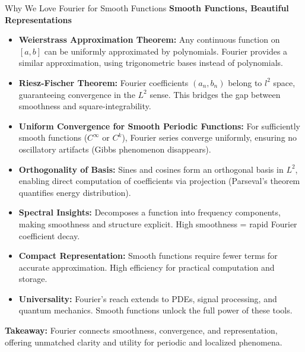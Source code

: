 \begin{frame}{Why We Love Fourier for Smooth Functions}
    \textbf{Smooth Functions, Beautiful Representations}
    \begin{itemize}
        \item \textbf{Weierstrass Approximation Theorem:} 
        Any continuous function on \([a, b]\) can be uniformly approximated by polynomials. Fourier provides a similar approximation, using trigonometric bases instead of polynomials.
        
        \item \textbf{Riesz-Fischer Theorem:} 
        Fourier coefficients \((a_n, b_n)\) belong to \(l^2\) space, guaranteeing convergence in the \(L^2\) sense. This bridges the gap between smoothness and square-integrability.

        \item \textbf{Uniform Convergence for Smooth Periodic Functions:} 
        For sufficiently smooth functions (\(C^\infty\) or \(C^k\)), Fourier series converge uniformly, ensuring no oscillatory artifacts (Gibbs phenomenon disappears).

        \item \textbf{Orthogonality of Basis:} 
        Sines and cosines form an orthogonal basis in \(L^2\), enabling direct computation of coefficients via projection (Parseval's theorem quantifies energy distribution).

        \item \textbf{Spectral Insights:} 
        Decomposes a function into frequency components, making smoothness and structure explicit. High smoothness = rapid Fourier coefficient decay.

        \item \textbf{Compact Representation:} 
        Smooth functions require fewer terms for accurate approximation. High efficiency for practical computation and storage.

        \item \textbf{Universality:} 
        Fourier's reach extends to PDEs, signal processing, and quantum mechanics. Smooth functions unlock the full power of these tools.
    \end{itemize}
    \vspace{1em}
    \textbf{Takeaway:} Fourier connects smoothness, convergence, and representation, offering unmatched clarity and utility for periodic and localized phenomena.
\end{frame}

